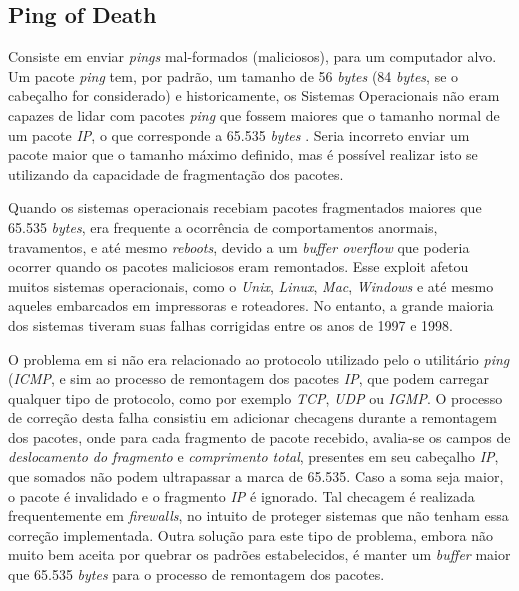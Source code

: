 \subsection{Ping of Death}

Consiste em enviar \textit{pings} mal-formados (maliciosos), para um computador alvo. Um pacote \textit{ping} tem, por padrão, um tamanho de 56 \textit{bytes} (84 \textit{bytes}, se o cabeçalho for considerado) e historicamente, os Sistemas Operacionais não eram capazes de lidar com pacotes \textit{ping} que fossem maiores que o tamanho normal de um pacote \textit{IP}, o que corresponde a 65.535 \textit{bytes} \cite{RFC791}. Seria incorreto enviar um pacote maior que o tamanho máximo definido, mas é possível realizar isto se utilizando da capacidade de fragmentação dos pacotes.

Quando os sistemas operacionais recebiam pacotes fragmentados maiores que 65.535 \textit{bytes}, era frequente a ocorrência de comportamentos anormais, travamentos, e até mesmo \textit{reboots}, devido a um \textit{buffer overflow} que poderia ocorrer quando os pacotes maliciosos eram remontados. Esse exploit afetou muitos sistemas operacionais, como o \textit{Unix}, \textit{Linux}, \textit{Mac}, \textit{Windows} e até mesmo aqueles embarcados em impressoras e roteadores. No entanto, a grande maioria dos sistemas tiveram suas falhas corrigidas entre os anos de 1997 e 1998.

O problema em si não era relacionado ao protocolo utilizado pelo o utilitário \textit{ping} (\textit{ICMP}, e sim ao processo de remontagem dos pacotes \textit{IP}, que podem carregar qualquer tipo de protocolo, como por exemplo \textit{TCP}, \textit{UDP} ou \textit{IGMP}. O processo de correção desta falha consistiu em adicionar checagens durante a remontagem dos pacotes, onde para cada fragmento de pacote recebido, avalia-se os campos de \textit{deslocamento do fragmento} e \textit{comprimento total}, presentes em seu cabeçalho \textit{IP}, que somados não podem ultrapassar a marca de 65.535. Caso a soma seja maior, o pacote é invalidado e o fragmento \textit{IP} é ignorado. Tal checagem é realizada frequentemente em \textit{firewalls}, no intuito de proteger sistemas que não tenham essa correção implementada. Outra solução para este tipo de problema, embora não muito bem aceita por quebrar os padrões estabelecidos, é manter um \textit{buffer} maior que 65.535 \textit{bytes} para o processo de remontagem dos pacotes.

